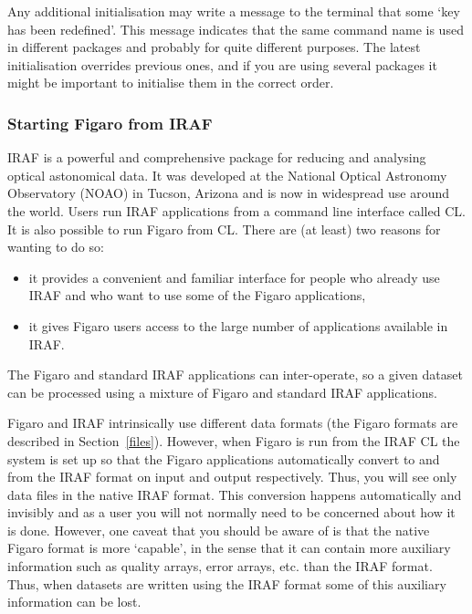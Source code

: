 \documentclass[11pt,twoside]{article}
\begin{document}
   Any additional initialisation may write a message to the terminal that
   some `key has been redefined'.  This message indicates that the same
   command name is used in different packages and probably for quite
   different purposes.  The latest initialisation overrides previous ones,
   and if you are using several packages it might be important to
   initialise them in the correct order.

\subsubsection{Starting Figaro from IRAF}

   IRAF is a powerful and comprehensive package for reducing and
   analysing optical astonomical data.  It was developed at the
   National Optical Astronomy Observatory (NOAO) in Tucson, Arizona and
   is now in widespread use around the world.  Users run IRAF
   applications from a command line interface called CL.  It is also
   possible to run Figaro from CL.  There are (at least) two reasons
   for wanting to do so:

  \begin{itemize}

    \item it provides a convenient and familiar interface for people
     who already use IRAF and who want to use some of the Figaro
     applications,

    \item it gives Figaro users access to the large number of
     applications available in IRAF.

  \end{itemize}

   The Figaro and standard IRAF applications can inter-operate, so a
   given dataset can be processed using a mixture of Figaro and standard
   IRAF applications.

   Figaro and IRAF intrinsically use different data formats (the Figaro
   formats are described in Section~\ref{files}).  However, when Figaro
   is run from the IRAF CL the system is set up so that the Figaro
   applications  automatically convert to and from the IRAF format on
   input and output respectively.  Thus, you will see only data files
   in the native IRAF format.  This conversion happens automatically
   and invisibly and as a user you will not normally need to be
   concerned about how it is done.  However, one caveat that you should
   be aware of is that the native Figaro format is more `capable', in
   the sense that it can contain more auxiliary information  such as
   quality arrays, error arrays, etc. than the IRAF format.  Thus, when
   datasets are written using the IRAF format some of this auxiliary
   information can be lost.
\end{document}
